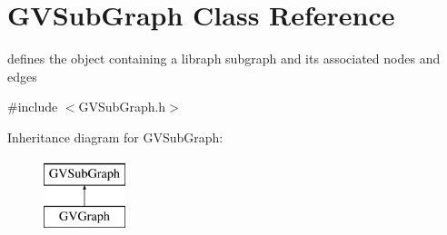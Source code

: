 \hypertarget{class_g_v_sub_graph}{\section{\-G\-V\-Sub\-Graph \-Class \-Reference}
\label{class_g_v_sub_graph}
}


defines the object containing a libraph subgraph and its associated nodes and edges  




{\ttfamily \#include $<$\-G\-V\-Sub\-Graph.\-h$>$}

\-Inheritance diagram for \-G\-V\-Sub\-Graph\-:\begin{figure}[H]
\begin{center}
\leavevmode
\includegraphics[height=2.000000cm]{class_g_v_sub_graph}
\end{center}
\end{figure}
